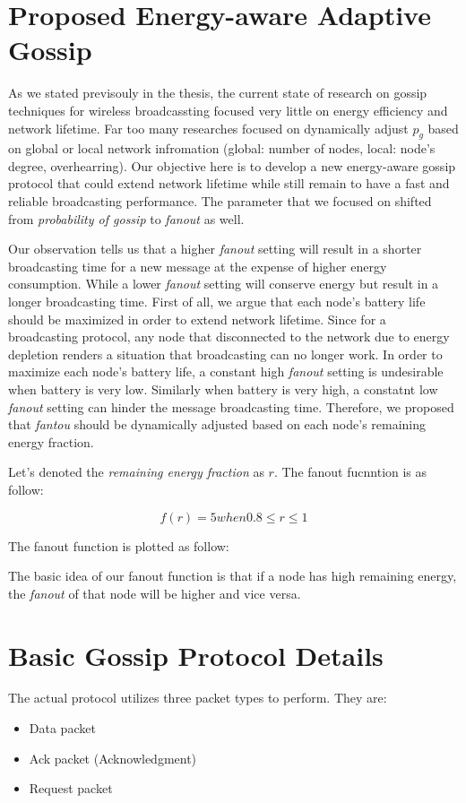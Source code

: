 \section{Proposed Energy-aware Adaptive Gossip}
As we stated previsouly in the thesis, the current state of research on gossip techniques for wireless broadcassting focused very little on energy efficiency and network lifetime. Far too many researches focused on dynamically adjust $p_g$ based on global or local network infromation (global: number of nodes, local: node's degree, overhearring). Our objective here is to develop a new energy-aware gossip protocol that could extend network lifetime while still remain to have a fast and reliable broadcasting performance. The parameter that we focused on shifted from \emph{probability of gossip} to \emph{fanout} as well. 

Our observation tells us that a higher \emph{fanout} setting will result in a shorter broadcasting time for a new message at the expense of higher energy consumption. While a lower \emph{fanout} setting will conserve energy but result in a longer broadcasting time. First of all, we argue that each node's battery life should be maximized in order to extend network lifetime. Since for a broadcasting protocol, any node that disconnected to the network due to energy depletion renders a situation that broadcasting can no longer work. In order to maximize each node's battery life, a constant high \emph{fanout} setting is undesirable when battery is very low. Similarly when battery is very high, a constatnt low \emph{fanout} setting can hinder the message broadcasting time. Therefore, we proposed that \emph{fantou} should be dynamically adjusted based on each node's remaining energy fraction. 

Let's denoted the \emph{remaining energy fraction} as $r$. The fanout fucnntion is as follow:

\[ f(r) = 5 when 0.8 \leq r \leq 1\]

The fanout function is plotted as follow:


The basic idea of our fanout function is that if a node has high remaining energy, the \emph{fanout} of that node will be higher and vice versa. 


\section{Basic Gossip Protocol Details}
The actual protocol utilizes three packet types to perform. They are:
\begin{itemize}
	\item Data packet
	\item Ack packet  (Acknowledgment)
	\item Request packet
\end{itemize}

